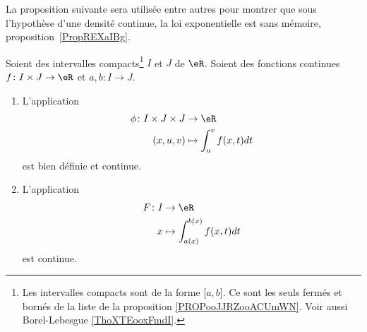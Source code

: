 La proposition suivante sera utilisée entre autres pour montrer que sous l'hypothèse d'une densité continue, la loi exponentielle est sans mémoire, proposition~\ref{PropREXaIBg}.
\begin{proposition}     \label{PROPooIEUTooAfHqaC}
	Soient des intervalles compacts\footnote{Les intervalles compacts sont de la forme \( \mathopen[ a,b\mathclose]\). Ce sont les seuls fermés et bornés de la liste de la proposition \ref{PROPooJJRZooACUmWN}. Voir aussi Borel-Lebesgue \ref{ThoXTEooxFmdI}.} \( I\) et \( J\) de \( \eR\). Soient des fonctions continues \(f \colon I\times J\to \eR  \) et \(a,b \colon I\to J  \).
	\begin{enumerate}
		\item
		      L'application
		      \begin{equation}
			      \begin{aligned}
				      \phi\colon I\times J\times J & \to \eR                  \\
				      (x,u,v)                      & \mapsto \int_u^vf(x,t)dt
			      \end{aligned}
		      \end{equation}
		      est bien définie et continue.
		\item
		      L'application
		      \begin{equation}
			      \begin{aligned}
				      F\colon I & \to \eR                            \\
				      x         & \mapsto \int_{a(x)}^{b(x)}f(x,t)dt
			      \end{aligned}
		      \end{equation}
		      est continue.
	\end{enumerate}
\end{proposition}

